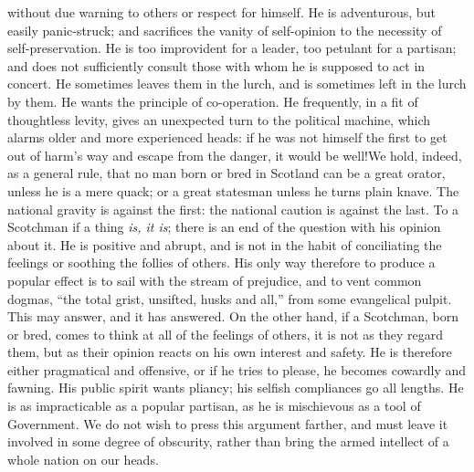 without due warning to others or respect for himself. He is
adventurous, but easily panic-struck; and sacrifices the vanity of
self-opinion to the necessity of self-preservation. He is too
improvident for a leader, too petulant for a partisan; and does
not sufficiently consult those with whom he is supposed to act in
concert. He sometimes leaves them in the lurch, and is sometimes
left in the lurch by them. He wants the principle of
co-operation. He frequently, in a fit of thoughtless levity, gives
an unexpected turn to the political machine, which alarms older
and more experienced heads: if he was not himself the first to get
out of harm's way and escape from the danger, it would be
well!\textemdash We hold, indeed, as a general rule, that no man
born or bred in Scotland can be a great orator, unless he is a
mere quack; or a great statesman unless he turns plain knave. The
national gravity is against the first: the national caution is
against the last. To a Scotchman if a thing \emph{is, it is};
there is an end of the question with his opinion about it. He is
positive and abrupt, and is not in the habit of conciliating the
feelings or soothing the follies of others. His only way therefore
to produce a popular effect is to sail with the stream of
prejudice, and to vent common dogmas, ``the total grist, unsifted,
husks and all,'' from some evangelical pulpit. This may answer,
and it has answered. On the other hand, if a Scotchman, born or
bred, comes to think at all of the feelings of others, it is not
as they regard them, but as their opinion reacts on his own
interest and safety. He is therefore either pragmatical and
offensive, or if he tries to please, he becomes cowardly and
fawning. His public spirit wants pliancy; his selfish compliances
go all lengths. He is as impracticable as a popular partisan, as
he is mischievous as a tool of Government. We do not wish to press
this argument farther, and must leave it involved in some degree
of obscurity, rather than bring the armed intellect of a whole
nation on our heads.

